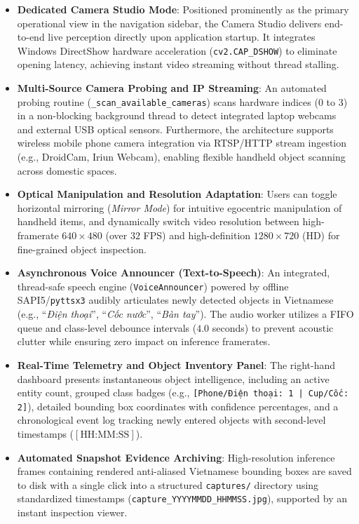 \begin{itemize}
    \item \textbf{Dedicated Camera Studio Mode}: Positioned prominently as the primary operational view in the navigation sidebar, the Camera Studio delivers end-to-end live perception directly upon application startup. It integrates Windows DirectShow hardware acceleration (\texttt{cv2.CAP\_DSHOW}) to eliminate opening latency, achieving instant video streaming without thread stalling.
    \item \textbf{Multi-Source Camera Probing and IP Streaming}: An automated probing routine (\texttt{\_scan\_available\_cameras}) scans hardware indices ($0$ to $3$) in a non-blocking background thread to detect integrated laptop webcams and external USB optical sensors. Furthermore, the architecture supports wireless mobile phone camera integration via RTSP/HTTP stream ingestion (e.g., DroidCam, Iriun Webcam), enabling flexible handheld object scanning across domestic spaces.
    \item \textbf{Optical Manipulation and Resolution Adaptation}: Users can toggle horizontal mirroring (\textit{Mirror Mode}) for intuitive egocentric manipulation of handheld items, and dynamically switch video resolution between high-framerate $640 \times 480$ (over $32$ FPS) and high-definition $1280 \times 720$ (HD) for fine-grained object inspection.
    \item \textbf{Asynchronous Voice Announcer (Text-to-Speech)}: An integrated, thread-safe speech engine (\texttt{VoiceAnnouncer}) powered by offline SAPI5/\texttt{pyttsx3} audibly articulates newly detected objects in Vietnamese (e.g., ``\textit{Điện thoại}'', ``\textit{Cốc nước}'', ``\textit{Bàn tay}''). The audio worker utilizes a FIFO queue and class-level debounce intervals ($4.0$ seconds) to prevent acoustic clutter while ensuring zero impact on inference framerates.
    \item \textbf{Real-Time Telemetry and Object Inventory Panel}: The right-hand dashboard presents instantaneous object intelligence, including an active entity count, grouped class badges (e.g., \texttt{[Phone/Điện thoại: 1 | Cup/Cốc: 2]}), detailed bounding box coordinates with confidence percentages, and a chronological event log tracking newly entered objects with second-level timestamps ($[\text{HH:MM:SS}]$).
    \item \textbf{Automated Snapshot Evidence Archiving}: High-resolution inference frames containing rendered anti-aliased Vietnamese bounding boxes are saved to disk with a single click into a structured \texttt{captures/} directory using standardized timestamps (\texttt{capture\_YYYYMMDD\_HHMMSS.jpg}), supported by an instant inspection viewer.
\end{itemize}

